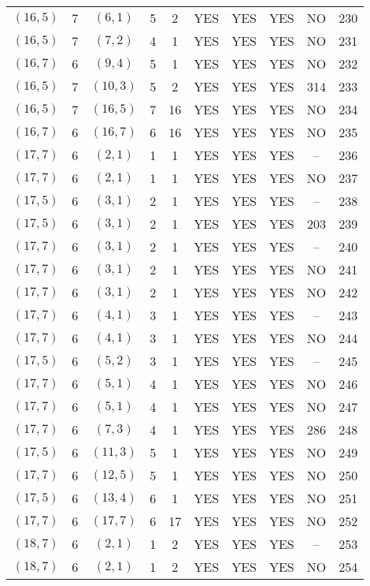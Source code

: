 \begin{longtable}{|c|c|c|c|c|c|c|c|c|c|}
$(16, 5)$ & 7 & $(6, 1)$ & 5 & 2 & YES & YES & YES & NO & 230\\
$(16, 5)$ & 7 & $(7, 2)$ & 4 & 1 & YES & YES & YES & NO & 231\\
$(16, 7)$ & 6 & $(9, 4)$ & 5 & 1 & YES & YES & YES & NO & 232\\
$(16, 5)$ & 7 & $(10, 3)$ & 5 & 2 & YES & YES & YES & 314 & 233\\
$(16, 5)$ & 7 & $(16, 5)$ & 7 & 16 & YES & YES & YES & NO & 234\\
$(16, 7)$ & 6 & $(16, 7)$ & 6 & 16 & YES & YES & YES & NO & 235\\
$(17, 7)$ & 6 & $(2, 1)$ & 1 & 1 & YES & YES & YES & -- & 236\\
$(17, 7)$ & 6 & $(2, 1)$ & 1 & 1 & YES & YES & YES & NO & 237\\
$(17, 5)$ & 6 & $(3, 1)$ & 2 & 1 & YES & YES & YES & -- & 238\\
$(17, 5)$ & 6 & $(3, 1)$ & 2 & 1 & YES & YES & YES & 203 & 239\\
$(17, 7)$ & 6 & $(3, 1)$ & 2 & 1 & YES & YES & YES & -- & 240\\
$(17, 7)$ & 6 & $(3, 1)$ & 2 & 1 & YES & YES & YES & NO & 241\\
$(17, 7)$ & 6 & $(3, 1)$ & 2 & 1 & YES & YES & YES & NO & 242\\
$(17, 7)$ & 6 & $(4, 1)$ & 3 & 1 & YES & YES & YES & -- & 243\\
$(17, 7)$ & 6 & $(4, 1)$ & 3 & 1 & YES & YES & YES & NO & 244\\
$(17, 5)$ & 6 & $(5, 2)$ & 3 & 1 & YES & YES & YES & -- & 245\\
$(17, 7)$ & 6 & $(5, 1)$ & 4 & 1 & YES & YES & YES & NO & 246\\
$(17, 7)$ & 6 & $(5, 1)$ & 4 & 1 & YES & YES & YES & NO & 247\\
$(17, 7)$ & 6 & $(7, 3)$ & 4 & 1 & YES & YES & YES & 286 & 248\\
$(17, 5)$ & 6 & $(11, 3)$ & 5 & 1 & YES & YES & YES & NO & 249\\
$(17, 7)$ & 6 & $(12, 5)$ & 5 & 1 & YES & YES & YES & NO & 250\\
$(17, 5)$ & 6 & $(13, 4)$ & 6 & 1 & YES & YES & YES & NO & 251\\
$(17, 7)$ & 6 & $(17, 7)$ & 6 & 17 & YES & YES & YES & NO & 252\\
$(18, 7)$ & 6 & $(2, 1)$ & 1 & 2 & YES & YES & YES & -- & 253\\
$(18, 7)$ & 6 & $(2, 1)$ & 1 & 2 & YES & YES & YES & NO & 254\\

\end{longtable}
